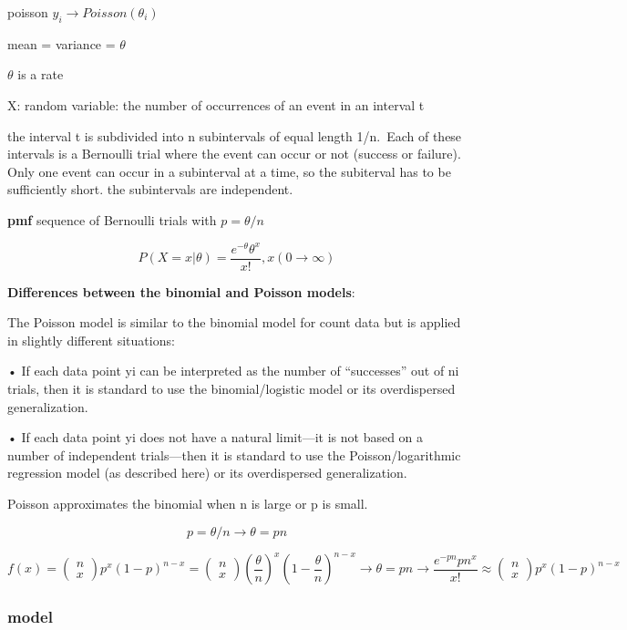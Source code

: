 \documentclass[
]{article}
\begin{document}
poisson \(y_i \to Poisson(\theta_i)\)

mean = variance = \(\theta\)

\(\theta\) is a rate

X: random variable: the number of occurrences of an event in an interval
t

the interval t is subdivided into n subintervals of equal length
1/n.~Each of these intervals is a Bernoulli trial where the event can
occur or not (success or failure). Only one event can occur in a
subinterval at a time, so the subiterval has to be sufficiently short.
the subintervals are independent.

\textbf{pmf} sequence of Bernoulli trials with \(p=\theta/n\)

\[P(X=x|\theta)= \frac{e^{-\theta}\theta^x}{x!}, x (0 \to \infty)\]

\textbf{Differences between the binomial and Poisson models}:

The Poisson model is similar to the binomial model for count data but is
applied in slightly different situations:

• If each data point yi can be interpreted as the number of
``successes'' out of ni trials, then it is standard to use the
binomial/logistic model or its overdispersed generalization.

• If each data point yi does not have a natural limit---it is not based
on a number of independent trials---then it is standard to use the
Poisson/logarithmic regression model (as described here) or its
overdispersed generalization.

Poisson approximates the binomial when n is large or p is small.

\[p=\theta/n \to \theta = pn\]

\[f(x)= \begin{pmatrix} n\\x \end{pmatrix} p^x (1-p)^{n-x} = \begin{pmatrix} n\\x \end{pmatrix} (\frac{\theta}{n})^x (1-\frac{\theta}{n})^{n-x} \to \theta = pn \to \frac{e^{-pn}pn^x}{x!} \approx \begin{pmatrix} n\\x \end{pmatrix} p^x (1-p)^{n-x}\]

\hypertarget{model-2}{%
\subsubsection{model}\label{model-2}}
\end{document}
